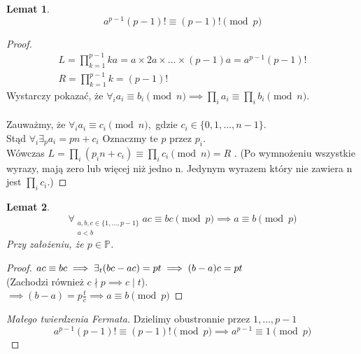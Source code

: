 \documentclass{article}
\theoremstyle{break}
\newtheorem{lemma}{Lemat}
\newtheorem{proof}{Dowód}
\begin{document}
\begin{lemma}
\begin{displaymath}
a^{p-1}(p-1)! \equiv (p-1)! \pmod{p}
\end{displaymath}
\end{lemma}
\begin{proof}
\begin{gather*}
L = \prod_{k=1}^{p-1} ka = a \times 2a \times \dots \times (p-1)a = a^{p-1}(p-1)! \\
R = \prod_{k=1}^{p-1} k = (p-1)!
\end{gather*}
Wystarczy pokazać, że $\forall_i a_i \equiv b_i \pmod{n} \implies \prod_i a_i \equiv \prod_i b_i \pmod{n}$. \\ \\
Zauważmy, że $\forall_i a_i \equiv c_i \pmod{n},$ gdzie $c_i \in \{0, 1, \dots, n-1\} $. \\
Stąd $ \forall_i \exists_{p} a_i = pn + c_i $ Oznaczmy te $p$ przez $p_i$. \\
Wówczas $L = \prod_i (p_in + c_i) \equiv \prod_i c_i \pmod{n} = R$ . (Po wymnożeniu wszystkie wyrazy, mają zero lub więcej niż jedno n. Jedynym wyrazem który nie zawiera n jest $\prod_i c_i.$)

\end{proof}

\begin{lemma}
\begin{displaymath}
\forall_{\substack{a,b,c \in \{1, \dots, p-1\} \\ a < b}} ac \equiv bc \pmod{p} \implies a \equiv b \pmod{p}
\end{displaymath}
Przy założeniu, że $ p \in \mathbb{P} $.
\end{lemma}
\begin{proof}
$ac \equiv bc \\ 
\implies \exists_{t} (bc - ac) = pt \\
\implies (b-a)c = pt$ \\
(Zachodzi również $c \nmid p \implies c \mid t$). \\
$\implies (b-a) = p\frac{t}{c} \implies a \equiv b \pmod{p}$
\end{proof}

\begin{proof}[Małego twierdzenia Fermata]
Dzielimy obustronnie przez $1, \dots, {p-1}$
\begin{displaymath}
a^{p-1}(p-1)! \equiv (p-1)! \pmod{p} \implies a^{p-1} \equiv 1 \pmod{p}
\end{displaymath}
\end{proof}
\end{document}
